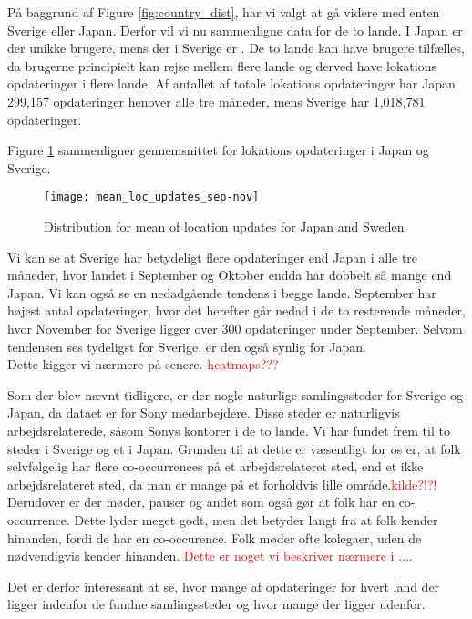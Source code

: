 På baggrund af Figure \ref{fig:country_dist}, har vi valgt at gå videre med enten Sverige eller Japan. Derfor vil vi nu sammenligne data for de to lande. 
I Japan er der \numberUsersJapan{} unikke brugere, mens der i Sverige er \numberUsersSweden. De to lande kan have brugere tilfælles, da brugerne principielt kan rejse mellem flere lande og derved have lokations opdateringer i flere lande.  
Af antallet af totale lokations opdateringer har Japan 299,157 opdateringer henover alle tre måneder, mens Sverige har 1,018,781 opdateringer.

Figure \ref{fig:mean_loc_updates_sep-nov} sammenligner gennemsnittet for lokations opdateringer i Japan og Sverige.
\begin{figure}[H]
    \hspace*{-2.2cm}
    \centering
    \texttt{[image: mean\_loc\_updates\_sep-nov]}
    \caption{Distribution for mean of location updates for Japan and Sweden}
    \label{fig:mean_loc_updates_sep-nov}
\end{figure}

Vi kan se at Sverige har betydeligt flere opdateringer end Japan i alle tre måneder, hvor landet i September og Oktober endda har dobbelt så mange end Japan. Vi kan også se en nedadgående tendens i begge lande. September har højest antal opdateringer, hvor det herefter går nedad i de to resterende måneder, hvor November for Sverige ligger over 300 opdateringer under September. Selvom tendensen ses tydeligst for Sverige, er den også synlig for Japan. \\
Dette kigger vi nærmere på senere. \textcolor{red}{heatmaps???}

Som der blev nævnt tidligere, er der nogle naturlige samlingssteder for Sverige og Japan, da dataet er for Sony medarbejdere. Disse steder er naturligvis arbejdsrelaterede, såsom Sonys kontorer i de to lande. Vi har fundet frem til to steder i Sverige og et i Japan. Grunden til at dette er væsentligt for os er, at folk selvfølgelig har flere co-occurrences på et arbejdsrelateret sted, end et ikke arbejdsrelateret sted, da man er mange på et forholdvis lille område.\textcolor{red}{kilde?!?!} Derudover er der møder, pauser og andet som også gør at folk har en co-occurrence. Dette lyder meget godt, men det betyder langt fra at folk kender hinanden, fordi de har en co-occurence. Folk møder ofte kolegaer, uden de nødvendigvis kender hinanden. \textcolor{red}{Dette er noget vi beskriver nærmere i ....}

Det er derfor interessant at se, hvor mange af opdateringer for hvert land der ligger indenfor de fundne samlingssteder og hvor mange der ligger udenfor. 

